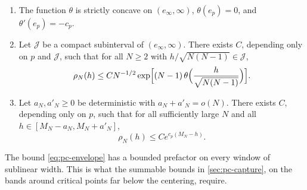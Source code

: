 \begin{lemma}\label{lem:pc-envelope}
\begin{enumerate}
\item The function $\theta$ is strictly concave on $(e_\infty,\infty)$, $\theta(e_p)=0$, and $\theta'(e_p)=-c_p$.
\item Let $\mathcal J$ be a compact subinterval of $(e_\infty,\infty)$. There exists $C$, depending only on $p$ and $\mathcal J$, such that for all $N\ge2$ with $h/\sqrt{N(N-1)}\in\mathcal J$,
\begin{equation}\label{eq:pc-rho-bound}
\rho_N(h)\le CN^{-1/2}\exp\Bigl[(N-1)\,\theta\Bigl(\frac h{\sqrt{N(N-1)}}\Bigr)\Bigr].
\end{equation}
\item Let $a_N,a'_N\ge0$ be deterministic with $a_N+a'_N=o(N)$. There exists $C$, depending only on $p$, such that for all sufficiently large $N$ and all $h\in[M_N-a_N,M_N+a'_N]$,
\begin{equation}\label{eq:pc-envelope}
\rho_N(h)\le Ce^{c_p(M_N-h)}.
\end{equation}
\end{enumerate}
\end{lemma}

The bound \eqref{eq:pc-envelope} has a bounded prefactor on every window of sublinear width. This is what the summable bounds in \cref{sec:pc-capture}, on the bands around critical points far below the centering, require.

